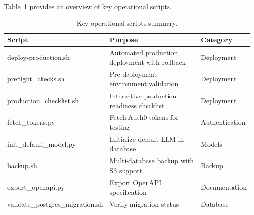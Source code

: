 Table~\ref{tab:scripts-summary} provides an overview of key operational scripts.

\begin{table}[ht]
\centering
\caption{Key operational scripts summary.}
\label{tab:scripts-summary}
\small
\begin{tabularx}{\textwidth}{lXl}
\hline
\textbf{Script} & \textbf{Purpose} & \textbf{Category} \\
\hline
deploy-production.sh & Automated production deployment with rollback & Deployment \\
preflight\_checks.sh & Pre-deployment environment validation & Deployment \\
production\_checklist.sh & Interactive production readiness checklist & Deployment \\
fetch\_tokens.py & Fetch Auth0 tokens for testing & Authentication \\
init\_default\_model.py & Initialize default LLM in database & Models \\
backup.sh & Multi-database backup with S3 support & Backup \\
export\_openapi.py & Export OpenAPI specification & Documentation \\
validate\_postgres\_migration.sh & Verify migration status & Database \\
\hline
\end{tabularx}
\end{table}

